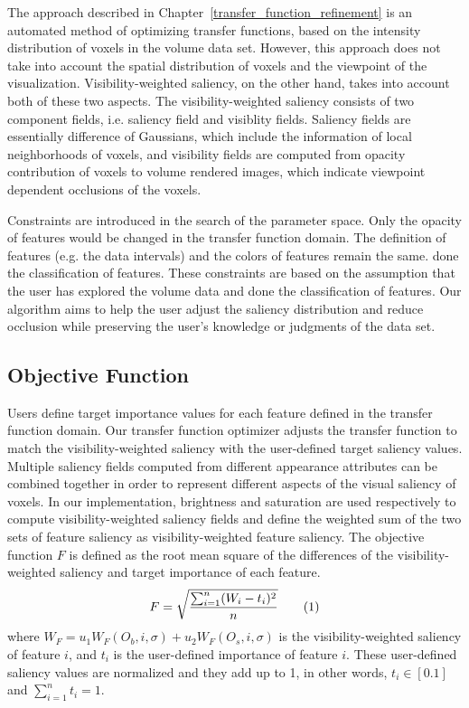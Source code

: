 The approach described in Chapter~\ref{transfer_function_refinement} is an automated method of optimizing transfer functions, based on the intensity distribution of voxels in the volume data set. However, this approach does not take into account the spatial distribution of voxels and the viewpoint of the visualization. Visibility-weighted saliency, on the other hand, takes into account both of these two aspects. The visibility-weighted saliency consists of two component fields, i.e. saliency field and visiblity fields. Saliency fields are essentially difference of Gaussians, which include the information of local neighborhoods of voxels, and visibility fields are computed from opacity contribution of voxels to volume rendered images, which indicate viewpoint dependent occlusions of the voxels.

Constraints are introduced in the search of the parameter space. Only the opacity of features would be changed in the transfer function domain. The definition of features (e.g. the data intervals) and the colors of features remain the same.
done the classification of features.
These constraints are based on the assumption that the user has explored the volume data and done the classification of features.
Our algorithm aims to help the user adjust the saliency distribution and reduce occlusion while preserving the user's knowledge or judgments of the data set.

\subsection{Objective Function}
Users define target importance values for each feature defined in the transfer function domain.
Our transfer function optimizer adjusts the transfer function to match the visibility-weighted saliency with the user-defined target saliency values.
Multiple saliency fields computed from different appearance attributes can be combined together in order to represent different aspects of the visual saliency of voxels.
In our implementation, brightness and saturation are used respectively to compute visibility-weighted saliency fields and define the weighted sum of the two sets of feature saliency as visibility-weighted feature saliency.
The objective function $ F $ is defined as the root mean square of the differences of the visibility-weighted saliency and target importance of each feature.
\[ F=\sqrt{ \frac{\sum_{i=1}^{n} (W_{i}-t_{i})^{2}}{n} } 
\addtag \]
where $ W_{F}=u_{1}W_{F}(O_{b},i,\sigma)+u_{2}W_{F}(O_{s},i,\sigma) $ is the visibility-weighted saliency of feature $ i $, and $ t_{i} $ is the user-defined importance of feature $ i $. These user-defined saliency values are normalized and they add up to 1, in other words, $ t_{i} \in [0.1] $ and $ \sum_{i=1}^{n} t_{i} = 1 $.

